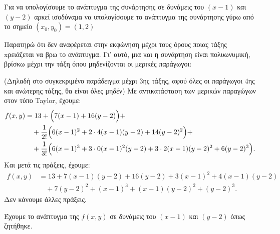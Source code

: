 



\everymath{\displaystyle}




  Για να υπολογίσουμε το ανάπτυγμα της συνάρτησης σε δυνάμεις του $(x-1)$ και $(y-2)$ 
  αρκεί ισοδύναμα να υπολογίσουμε το ανάπτυγμα της συνάρτησης γύρω από το 
  σημείο $(x_0,y_0)=(1,2)$

  Παρατηρώ ότι δεν αναφέρεται στην εκφώνηση μέχρι τους όρους ποιας τάξης 
  xρειάζεται να βρω το ανάπτυγμα.  Γι' αυτό, μια και η συνάρτηση είναι πολυωνυμική,
  βρίσκω μέχρι την τάξη όπου μηδενίζονται οι μερικές παράγωγοι: 

  (Δηλαδή στο συγκεκριμένο παράδειγμα μέχρι $3$ης τάξης, αφού όλες οι παράγωγοι 
  $4$ης και ανώτερης τάξης, θα είναι όλες μηδέν)
  Με αντικατάσταση των μερικών παραγώγων στον τύπο Taylor, έχουμε:
  \begin{equation*}
    \begin{split}
      f(x,y)&=13+\Bigl(7(x-1)+16(y-2)\Bigr)+ \\ 
            &\quad +\frac{1}{2!}\Bigl(6(x-1)^2 +2\cdot 4(x-1)(y-2)+14(y-2)^2\Bigr)+ \\
            &\quad +\frac{1}{3!}\Bigl(6(x-1)^3+3\cdot 0(x-1)^2(y-2)+3\cdot 2(x-1)(y-2)^2+6(y-2)^3\Bigr).
    \end{split}
  \end{equation*}
  Και μετά τις πράξεις, έχουμε: 
  \begin{equation*}
    \begin{split}
      f(x,y)&=13+7(x-1)(y-2)+16(y-2)+3(x-1)^2+4(x-1)(y-2) \\
            &\quad +7(y-2)^2+(x-1)^3+(x-1)(y-2)^2+(y-2)^3.
    \end{split}
  \end{equation*}
  Δεν κάνουμε άλλες πράξεις.

  Έχουμε το ανάπτυγμα της $f(x,y)$ σε δυνάμεις του $(x-1)$ και $(y-2)$ όπως ζητήθηκε.



